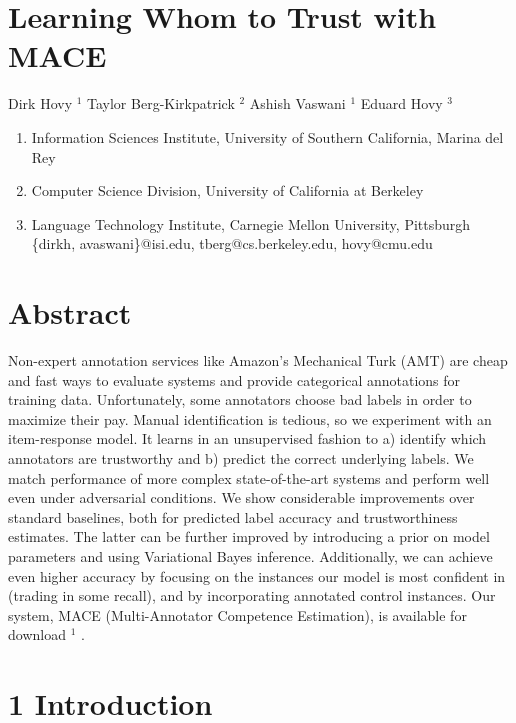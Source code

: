 \documentclass[
]{article}
\author{}
\date{}
\providecommand{\tightlist}{%
  \setlength{\itemsep}{0pt}\setlength{\parskip}{0pt}}
\begin{document}
\section{Learning Whom to Trust with
MACE}\label{learning-whom-to-trust-with-mace}

Dirk Hovy \(^{1}\) Taylor Berg-Kirkpatrick \(^{2}\) Ashish Vaswani
\(^{1}\) Eduard Hovy \(^{3}\)

\begin{enumerate}
\def\labelenumi{(\arabic{enumi})}
\tightlist
\item
  Information Sciences Institute, University of Southern California,
  Marina del Rey\\
\item
  Computer Science Division, University of California at Berkeley\\
\item
  Language Technology Institute, Carnegie Mellon University, Pittsburgh
  \{dirkh, avaswani\}@isi.edu, tberg@cs.berkeley.edu, hovy@cmu.edu
\end{enumerate}

\section{Abstract}\label{abstract}

Non-expert annotation services like Amazon's Mechanical Turk (AMT) are
cheap and fast ways to evaluate systems and provide categorical
annotations for training data. Unfortunately, some annotators choose bad
labels in order to maximize their pay. Manual identification is tedious,
so we experiment with an item-response model. It learns in an
unsupervised fashion to a) identify which annotators are trustworthy and
b) predict the correct underlying labels. We match performance of more
complex state-of-the-art systems and perform well even under adversarial
conditions. We show considerable improvements over standard baselines,
both for predicted label accuracy and trustworthiness estimates. The
latter can be further improved by introducing a prior on model
parameters and using Variational Bayes inference. Additionally, we can
achieve even higher accuracy by focusing on the instances our model is
most confident in (trading in some recall), and by incorporating
annotated control instances. Our system, MACE (Multi-Annotator
Competence Estimation), is available for download \(^{1}\) .

\section{1 Introduction}\label{introduction}
\end{document}
